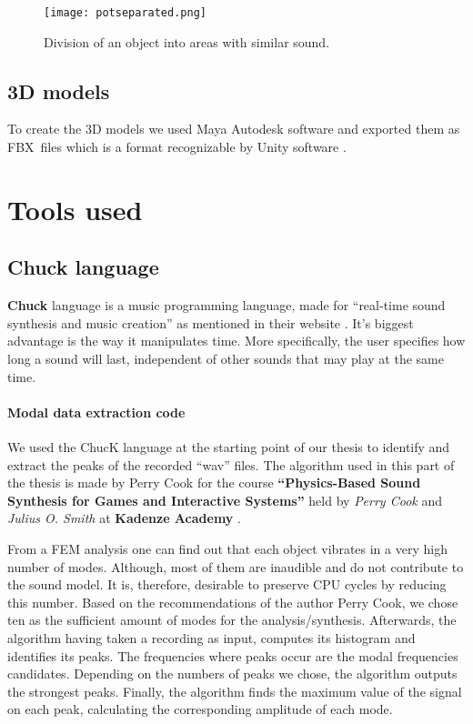 \begin{figure}[H]
  \centering
    \texttt{[image: potseparated.png]}
      \caption{Division of an object into areas with similar sound.}
      \label{fig:pot_sep}
\end{figure} 

\subsection{3D models}
To create the 3D models we used Maya Autodesk software \cite{bib:maya} and exported them as FBX\textregistered\ files \cite{bib:fbx} which is a format recognizable by Unity\textsuperscript{\textregistered} software \cite{bib:unity}.

\section{Tools used}

\subsection{Chuck language}\label{sec:chuck}
\textbf{Chuck} language is a music programming language, made for ``real-time sound synthesis and music creation'' as mentioned in their website \cite{bib:chuck}. It's biggest advantage is the way it manipulates time. More specifically, the user specifies how long a sound will last, independent of other sounds that may play at the same time.

\paragraph{Modal data extraction code\\}
We used the ChucK language at the starting point of our thesis to identify and extract the peaks of the recorded ``wav'' files. The algorithm used in this part of the thesis is made by Perry Cook for the course \textbf{``Physics-Based Sound Synthesis for Games and Interactive Systems''} held by \textit{Perry Cook} and \textit{Julius O. Smith} at \textbf{Kadenze Academy} \cite{bib:physicsbasedcourse}.

From a FEM analysis one can find out that each object vibrates in a very high number of modes. Although, most of them are inaudible and do not contribute to the sound model. It is, therefore, desirable to preserve CPU cycles by reducing this number. Based on the recommendations of the author Perry Cook, we chose ten as the sufficient amount of modes for the analysis/synthesis.  Afterwards, the algorithm having taken a recording as input, computes its histogram and identifies its peaks. The frequencies where peaks occur are the modal frequencies candidates. Depending on the numbers of peaks we chose, the algorithm outputs the strongest peaks. Finally, the algorithm finds the maximum value of the signal on each peak, calculating the corresponding amplitude of each mode.

